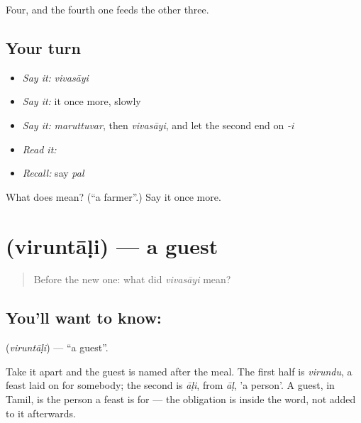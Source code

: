 \begin{grammarlens}[title={What you've built}]
Four, and the fourth one feeds the other three.
\end{grammarlens}

\subsection*{Your turn}
\begin{itemize}
\raggedright
  \item \emph{Say it:} \emph{vivasāyi}
  \item \emph{Say it:} it once more, slowly
  \item \emph{Say it:} \emph{maruttuvar}, then \emph{vivasāyi}, and let the second end on \emph{-i}
  \item \emph{Read it:} \textbf{}
  \item \emph{Recall:} say \emph{pal}
\end{itemize}

\begin{tcolorbox}[breakable,colback=teal!4,colframe=teal!35!black,title={Before you move on}]
What does  mean? (\textquotedblleft{}a farmer\textquotedblright{}.) Say it once more.
\end{tcolorbox}
\section[\texorpdfstring{\ta{விருந்தாளி} (viruntāḷi)}{விருந்தாளி (viruntāḷi)}]{ (viruntāḷi) — a guest}

\label{lesson:TA-C46-guest}



\begin{quote}
Before the new one: what did \emph{vivasāyi} mean?
\end{quote}

\subsection*{You'll want to know: }
\textbf{} (\emph{viruntāḷi}) — \textquotedblleft{}a guest\textquotedblright{}.

Take it apart and the guest is named after the meal. The first half is \emph{virundu}, a feast laid on for somebody; the second is \emph{āḷi}, from \emph{āḷ}, 'a person'. A guest, in Tamil, is the person a feast is for — the obligation is inside the word, not added to it afterwards.

